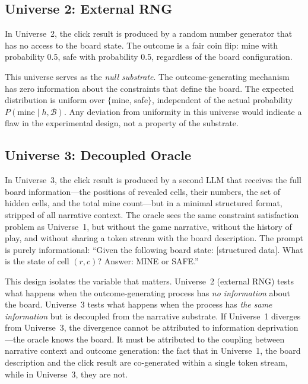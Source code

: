 \documentclass[12pt,a4paper]{article}
\begin{document}
\subsection{Universe 2: External RNG}
\label{sec:universe2}

In Universe~2, the click result is produced by a random number generator that has no access to the board state. The outcome is a fair coin flip: mine with probability 0.5, safe with probability 0.5, regardless of the board configuration.

This universe serves as the \emph{null substrate}. The outcome-generating mechanism has zero information about the constraints that define the board. The expected distribution is uniform over $\{$mine, safe$\}$, independent of the actual probability $P(\text{mine} \mid h, \mathcal{B})$. Any deviation from uniformity in this universe would indicate a flaw in the experimental design, not a property of the substrate.

\subsection{Universe 3: Decoupled Oracle}
\label{sec:universe3}

In Universe~3, the click result is produced by a second LLM that receives the full board information---the positions of revealed cells, their numbers, the set of hidden cells, and the total mine count---but in a minimal structured format, stripped of all narrative context. The oracle sees the same constraint satisfaction problem as Universe~1, but without the game narrative, without the history of play, and without sharing a token stream with the board description. The prompt is purely informational: ``Given the following board state: [structured data]. What is the state of cell $(r,c)$? Answer: MINE or SAFE.''

This design isolates the variable that matters. Universe~2 (external RNG) tests what happens when the outcome-generating process has \emph{no information} about the board. Universe~3 tests what happens when the process has \emph{the same information} but is decoupled from the narrative substrate. If Universe~1 diverges from Universe~3, the divergence cannot be attributed to information deprivation---the oracle knows the board. It must be attributed to the coupling between narrative context and outcome generation: the fact that in Universe~1, the board description and the click result are co-generated within a single token stream, while in Universe~3, they are not.
\end{document}
